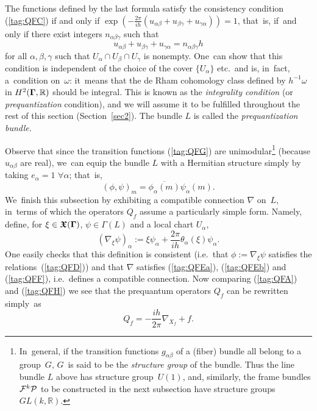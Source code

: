 \documentclass[12pt]{amsart}
\numberwithin{equation}{section}
\theoremstyle{remark}
\newcommand\Omg{{\bigam}}   %
\newcommand\FF{\Cal F}
\newcommand\PP{{\Cal P}}
\newcommand\RR{\mathbb R}
\newcommand{\bigam}{\mbox{\boldmath $\Gamma$}}
\newcommand{\bfrakX}{\mbox{\boldmath $\mathfrak X$}}
\begin{document}
    The functions defined by the last formula satisfy the consistency condition
(\ref{tag:QFC}) if and only if
$\exp(-\frac{2\pi}{ih}(u_{\alpha\beta}+u_{\beta\gamma}+
u_{\gamma\alpha}))=1$, that~is, if~and only if there exist integers
$n_{\alpha\beta\gamma}$ such that
$$ u_{\alpha\beta}+u_{\beta\gamma}+u_{\gamma\alpha}=n_{\alpha\beta\gamma}h  $$
for all $\alpha,\beta,\gamma$ such that $U_\alpha\cap U_\beta\cap U_\gamma$ is
nonempty. One~can show that this condition is independent of the choice of the
cover $\{U_\alpha\}$ etc.~and is, in~fact, a~condition on~$\omega$: it~means
that the de Rham cohomology class defined by $h^{-1}\omega$ in $H^2(\Omg,\RR)$
should be integral. This is known as the {\it integrality condition\/} (or~{\sl
prequantization\/} condition), and we will assume it to be fulfilled throughout
the rest of this section (Section~\ref{sec2}). The bundle $L$ is called the
{\it prequantization bundle.\/}


Observe that since the transition functions (\ref{tag:QFG}) are
unimodular\footnote{In~general, if the transition functions $g_{\alpha\beta}$
of a (fiber) bundle all belong to a group~$G$, $G$~is said to be the
{\it structure group\/} of the bundle. Thus the line bundle $L$ above has
structure group~$U(1)$, and, similarly, the frame bundles $\FF^k\PP$ to be
constructed in the next subsection have structure groups $GL(k,\RR)$.}
(because $u_{\alpha\beta}$ are real), we~can equip the bundle $L$ with a
Hermitian structure simply by taking $e_\alpha=1$ $\forall\alpha$; that~is,
$$ (\phi,\psi)_m = \overline{\phi_\alpha(m)} \psi_\alpha(m).  $$
We~finish this subsection by exhibiting a compatible connection $\nabla$
on~$L$, in~terms of which the operators $Q_f$ assume a particularly simple
form. Namely, define, for $\xi\in \bfrakX(\Omg)$, $\psi\in\Gamma(L)$ and a
local chart $U_\alpha$,
\begin{equation}  (\nabla_\xi \psi)_\alpha := \xi\psi_\alpha + \frac{2\pi}{ih}
\theta_\alpha(\xi) \psi_\alpha.  \label{tag:QFH}  \end{equation}
One easily checks that this definition is consistent (i.e.~that $\phi:=\nabla
_\xi\psi$ satisfies the relations~(\ref{tag:QFD})) and that $\nabla$ satisfies
(\ref{tag:QFEa}), (\ref{tag:QFEb}) and (\ref{tag:QFF}), i.e.~defines a
compatible connection. Now comparing (\ref{tag:QFA}) and (\ref{tag:QFH}) we see
that the prequantum operators $Q_f$ can be rewritten simply~as
\begin{equation}  Q_f = -\frac{ih}{2\pi} \nabla_{X_f} + f.  \label{tag:QFI}
\end{equation}
\end{document}
